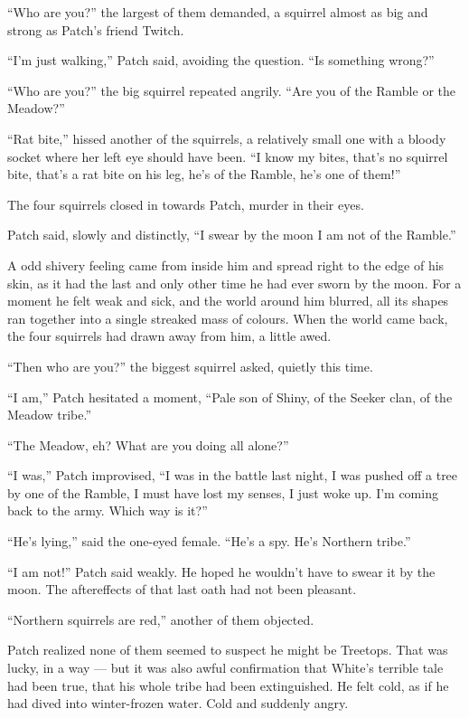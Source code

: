 \documentclass[12pt]{memoir}
\begin{document}
“Who are you?” the largest of them demanded, a squirrel almost as big
and strong as Patch’s friend Twitch.

“I’m just walking,” Patch said, avoiding the question. “Is something
wrong?”

“Who are you?” the big squirrel repeated angrily. “Are you of the
Ramble or the Meadow?”

“Rat bite,” hissed another of the squirrels, a relatively small one
with a bloody socket where her left eye should have been. “I know my
bites, that’s no squirrel bite, that’s a rat bite on his leg, he’s of
the Ramble, he’s one of them!”

The four squirrels closed in towards Patch, murder in their eyes.

Patch said, slowly and distinctly, “I swear by the moon I am not of
the Ramble.”

A odd shivery feeling came from inside him and spread right to the
edge of his skin, as it had the last and only other time he had ever
sworn by the moon. For a moment he felt weak and sick, and the world
around him blurred, all its shapes ran together into a single streaked
mass of colours. When the world came back, the four squirrels had
drawn away from him, a little awed.

“Then who are you?” the biggest squirrel asked, quietly this time.

“I am,” Patch hesitated a moment, “Pale son of Shiny, of the Seeker
clan, of the Meadow tribe.”

“The Meadow, eh? What are you doing all alone?”

“I was,” Patch improvised, “I was in the battle last night, I was
pushed off a tree by one of the Ramble, I must have lost my senses, I
just woke up. I’m coming back to the army. Which way is it?”

“He’s lying,” said the one-eyed female. “He’s a spy. He’s Northern
tribe.”

“I am not!” Patch said weakly. He hoped he wouldn’t have to swear it
by the moon. The aftereffects of that last oath had not been pleasant.

“Northern squirrels are red,” another of them objected.

Patch realized none of them seemed to suspect he might be
Treetops. That was lucky, in a way — but it was also awful
confirmation that White’s terrible tale had been true, that his whole
tribe had been extinguished. He felt cold, as if he had dived into
winter-frozen water. Cold and suddenly angry.
\end{document}
